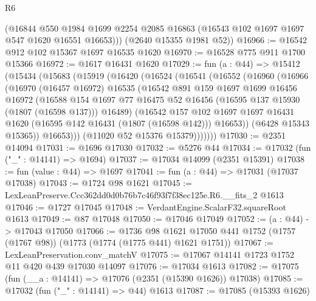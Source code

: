 \begin{lexlean}{R6}
\begin{coremodule}
        (@16844
          @550
          @1984
          @1699
          @2254
          @2085
          @16863
          (@16543 @102 @1697 @1697 @547 @1620 @16551 @16653)))
      (@2640 @15355 @1981 @52))
@16966 := @16542 @912 @102 @15367 @1697 @16535 @1620
@16970 := @16528 @775 @911 @1700 @15366
@16972 := @1617 @16431 @1620
@17029 := fun (a : @44) =>
  @15412
    (@15434
      (@15683
        (@15919
          (@16420
            (@16524
              (@16541
                (@16552
                  (@16960
                    (@16966
                      (@16970
                        (@16457 @16972)
                        @16535
                        (@16542
                          @891
                          @159
                          @1697
                          @1699
                          @16456
                          @16972
                          (@16588
                            @154
                            @1697
                            @77
                            @16475
                            @52
                            @16456
                            (@16595 @137 @15930 (@1807 (@16598 @137)))
                            @16489)
                          (@16542
                            @157
                            @102
                            @1697
                            @1697
                            @16431
                            @1620
                            (@16595 @142 @16431 (@1807 (@16598 @142)))
                            @16653))
                        (@6428 @15343 @15365))
                      @16653)))
                (@11020 @52 @15376 @15379)))))))
@17030 := @2351 @14094
@17031 := @1696 @17030
@17032 := @5276 @44
@17034 := @17032 (fun ("_" : @14141) => @1694)
@17037 := @17034 @14099 (@2351 @15391)
@17038 := fun (value : @44) => @1697
@17041 := fun (a : @44) => @17031 (@17037 @17038)
@17043 := @1724 @98 @1621
@17045 := LexLeanPreserve.Ccc362dd0d0b76b7c46f93f7f38ec125e.R6.__fits_2 @1613
@17046 := @1727 @17045
@17048 := VerdantEngine.ScalarF32.squareRoot @1613
@17049 := @87 @17048
@17050 := @17046 @17049
@17052 := (a : @44) -> @17043 @17050
@17066 := @1736
    @98
    @1621
    @17050
    @441
    @1752
    (@1757 (@1767 @98))
    (@1773 (@1774 (@1775 @441) @1621 @1751))
@17067 := LexLeanPreservation.conv_matchV
@17075 := @17067 @14141 @1723 @1752 @11 @420 @439 @17030 @14097
@17076 := @17034 @1613
@17082 := @17075 (fun (__a : @14141) => @17076 (@2351 (@15390 @1626)) @17038)
@17085 := @17032 (fun ("_" : @14141) => @44) @1613
@17087 := @17085 (@15393 @1626)

\end{coremodule}
\end{lexlean}
